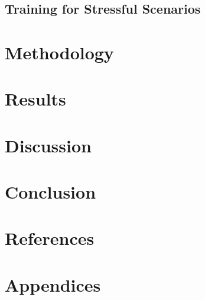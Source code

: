 \documentclass[12pt]{article}
\begin{document}
\subsection{Training for Stressful Scenarios}

\section{Methodology}

\section{Results}

\section{Discussion}

\section{Conclusion}

\section{References}




\section{Appendices}
\end{document}

